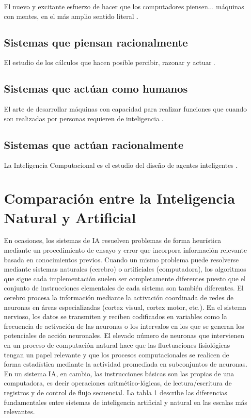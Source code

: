 El nuevo y excitante esfuerzo de hacer que los
computadores piensen... máquinas con mentes, en
el más amplio sentido literal \citep{Haugeland}. \bigskip

\subsection{Sistemas que piensan racionalmente}

El estudio de los c\'alculos que hacen posible
percibir, razonar y actuar \citep{Winston}. \bigskip

\subsection{Sistemas que actúan como humanos}

El arte de desarrollar m\'aquinas con capacidad
para realizar funciones que cuando son realizadas por personas requieren de inteligencia \citep{Kurzweil}. \bigskip

\subsection{Sistemas que actúan racionalmente}

La Inteligencia Computacional es el estudio
del dise\~no de agentes inteligentes \citep{Poole_et}. \bigskip 




\section{Comparaci\'on entre la Inteligencia Natural y Artificial}

En ocasiones, los sistemas de IA resuelven problemas de forma heurística mediante un procedimiento de ensayo y error que incorpora información relevante basada en conocimientos previos. Cuando un mismo problema puede resolverse mediante sistemas naturales (cerebro) o artificiales (computadora), los algoritmos que sigue cada implementación suelen ser completamente diferentes puesto que el conjunto de instrucciones elementales de cada sistema son también diferentes. El cerebro procesa la información mediante la activación coordinada de redes de neuronas en áreas especializadas (cortex visual, cortex motor, etc.). En el sistema nervioso, los datos se transmiten y reciben codificados en variables como la frecuencia de activación de las neuronas o los intervalos en los que se generan los potenciales de acción neuronales. El elevado número de neuronas que intervienen en un proceso de computación natural hace que las fluctuaciones fisiológicas tengan un papel relevante y que los procesos computacionales se realicen de forma estadística mediante la actividad promediada en subconjuntos de neuronas. En un sistema IA, en cambio, las instrucciones básicas son las propias de una computadora, es decir operaciones aritmético-lógicas, de lectura/escritura de registros y de control de flujo secuencial. La tabla 1 describe las diferencias fundamentales entre sistemas de inteligencia artificial y natural en las escalas más relevantes. \bigskip

